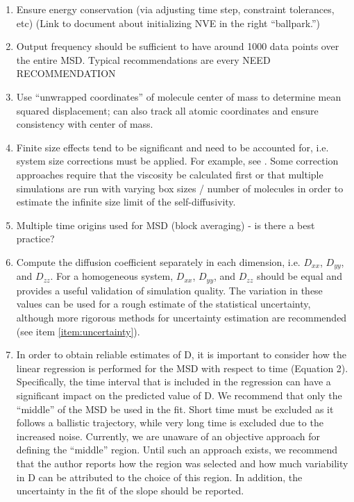 \documentclass[9pt]{livecoms}
\begin{document}
\begin{enumerate}
    \item Ensure energy conservation (via adjusting time step, constraint tolerances, etc) (Link to document about initializing NVE in the right “ballpark.”) 
    \item Output frequency should be sufficient to have around 1000 data points over the entire MSD. Typical recommendations are every NEED RECOMMENDATION
    \item Use ``unwrapped coordinates'' of molecule center of mass to determine mean squared displacement; can also track all atomic coordinates and ensure consistency with center of mass.
    \item Finite size effects tend to be significant and need to be accounted for, i.e. system size corrections must be applied. For example, see \cite{Yeh2004,Moultos2016}. Some correction approaches require that the viscosity be calculated first or that multiple simulations are run with varying box sizes / number of molecules in order to estimate the infinite size limit of the self-diffusivity.
    \item Multiple time origins used for MSD (block averaging) - is there a best practice?
	\item Compute the diffusion coefficient separately in each dimension, i.e. $D_{xx}$, $D_{yy}$, and $D_{zz}$. For a homogeneous system, $D_{xx}$, $D_{yy}$, and $D_{zz}$ should be equal and provides a useful validation of simulation quality. The variation in these values can be used for a rough estimate of the statistical uncertainty, although more rigorous methods for uncertainty estimation are recommended (see item \ref{item:uncertainty}).
	\item In order to obtain reliable estimates of D, it is important to consider how the linear regression is performed for the MSD with respect to time (Equation 2). Specifically, the time interval that is included in the regression can have a significant impact on the predicted value of D. We recommend that only the “middle” of the MSD be used in the fit. Short time must be excluded as it follows a ballistic trajectory, while very long time is excluded due to the increased noise. Currently, we are unaware of an objective approach for defining the “middle” region. Until such an approach exists, we recommend that the author reports how the region was selected and how much variability in D can be attributed to the choice of this region. In addition, the uncertainty in the fit of the slope should be reported.

\end{enumerate}
\end{document}
